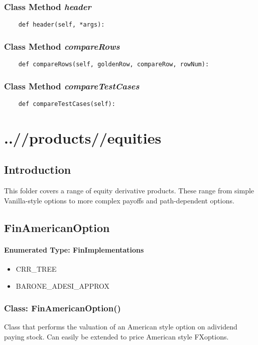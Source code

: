 \documentclass[twoside,11pt]{book}
\begin{document}
\subsection{Class Method {\it header}}


\begin{lstlisting}
    def header(self, *args):
\end{lstlisting}

\subsection{Class Method {\it compareRows}}


\begin{lstlisting}
    def compareRows(self, goldenRow, compareRow, rowNum):
\end{lstlisting}

\subsection{Class Method {\it compareTestCases}}


\begin{lstlisting}
    def compareTestCases(self):
\end{lstlisting}


\chapter{..//products//equities}
\section{Introduction}
This folder covers a range of equity derivative products. These range from simple Vanilla-style options to more complex payoffs and path-dependent options. 
\newpage
\section{FinAmericanOption}

\subsubsection{Enumerated Type: FinImplementations}
\begin{itemize}
\item{CRR\_TREE}
\item{BARONE\_ADESI\_APPROX}
\end{itemize}

\subsection{Class: FinAmericanOption()}
Class that performs the valuation of an American style option on adividend paying stock. Can easily be extended to price American style FXoptions. 
\end{document}
